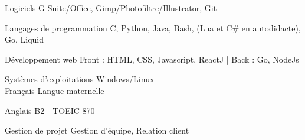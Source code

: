 
\begin{cvskills}

  \cvskill
    {Logiciels} %
    {G Suite/Office, Gimp/Photofiltre/Illustrator, Git} %
    
  \cvskill
    {Langages de programmation} %
    {C, Python, Java, Bash, (Lua et C\# en autodidacte), Go, Liquid} %
    
  \cvskill
    {Développement web} %
    {Front : HTML, CSS, Javascript, ReactJ | Back : Go, NodeJs} %

  \cvskill
    {Systèmes d’exploitations} %
    {Windows/Linux}\\ %
    
  \cvskill
    {Français} %
    {Langue maternelle} %
    
  \cvskill
    {Anglais} %
    {B2 - TOEIC 870} %
    

  \cvskill
    {Gestion de projet} %
    {Gestion d'équipe, Relation client} %
    
\end{cvskills}

